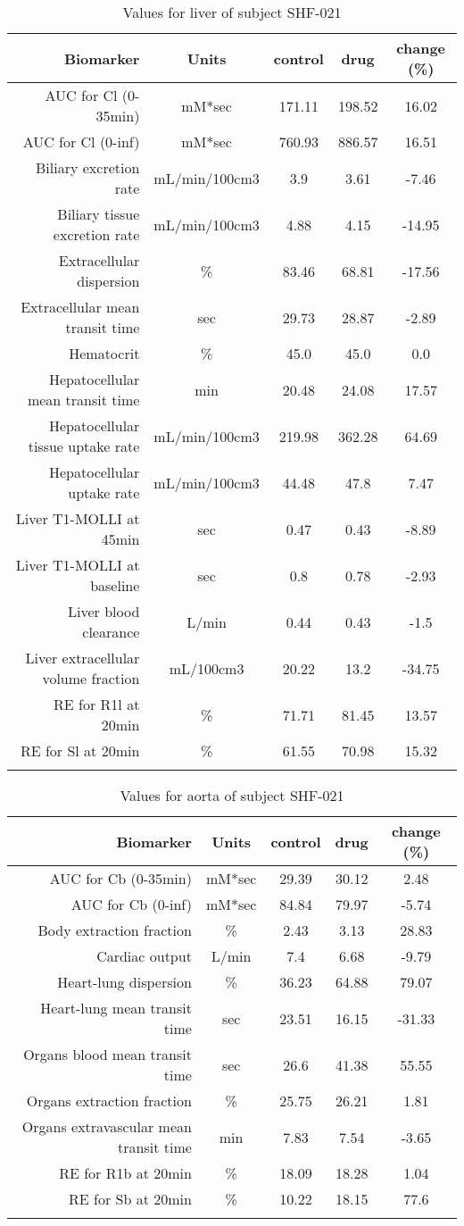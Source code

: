 \documentclass{epflreport}%
\begin{document}
%
\clearpage%
\begin{longtable}{rcccc}%
\hline%
Biomarker&Units&control&drug&change (\%)\\%
\hline%
AUC for Cl (0{-}35min)&mM*sec&171.11&198.52&16.02\\%
AUC for Cl (0{-}inf)&mM*sec&760.93&886.57&16.51\\%
Biliary excretion rate&mL/min/100cm3&3.9&3.61&{-}7.46\\%
Biliary tissue excretion rate&mL/min/100cm3&4.88&4.15&{-}14.95\\%
Extracellular dispersion&\%&83.46&68.81&{-}17.56\\%
Extracellular mean transit time&sec&29.73&28.87&{-}2.89\\%
Hematocrit&\%&45.0&45.0&0.0\\%
Hepatocellular mean transit time&min&20.48&24.08&17.57\\%
Hepatocellular tissue uptake rate&mL/min/100cm3&219.98&362.28&64.69\\%
Hepatocellular uptake rate&mL/min/100cm3&44.48&47.8&7.47\\%
Liver T1{-}MOLLI at 45min&sec&0.47&0.43&{-}8.89\\%
Liver T1{-}MOLLI at baseline&sec&0.8&0.78&{-}2.93\\%
Liver blood clearance&L/min&0.44&0.43&{-}1.5\\%
Liver extracellular volume fraction&mL/100cm3&20.22&13.2&{-}34.75\\%
RE for R1l at 20min&\%&71.71&81.45&13.57\\%
RE for Sl at 20min&\%&61.55&70.98&15.32\\%
\hline%
\caption{Values for liver of subject SHF-021} \\%
\end{longtable}%
\begin{longtable}{rcccc}%
\hline%
Biomarker&Units&control&drug&change (\%)\\%
\hline%
AUC for Cb (0{-}35min)&mM*sec&29.39&30.12&2.48\\%
AUC for Cb (0{-}inf)&mM*sec&84.84&79.97&{-}5.74\\%
Body extraction fraction&\%&2.43&3.13&28.83\\%
Cardiac output&L/min&7.4&6.68&{-}9.79\\%
Heart{-}lung dispersion&\%&36.23&64.88&79.07\\%
Heart{-}lung mean transit time&sec&23.51&16.15&{-}31.33\\%
Organs blood mean transit time&sec&26.6&41.38&55.55\\%
Organs extraction fraction&\%&25.75&26.21&1.81\\%
Organs extravascular mean transit time&min&7.83&7.54&{-}3.65\\%
RE for R1b at 20min&\%&18.09&18.28&1.04\\%
RE for Sb at 20min&\%&10.22&18.15&77.6\\%
\hline%
\caption{Values for aorta of subject SHF-021} \\%
\end{longtable}%
\clearpage%
\end{document}
